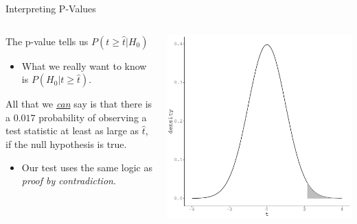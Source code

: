 \documentclass[10pt]{beamer}\usepackage[]{graphicx}\usepackage[]{color}
\makeatletter
\def\maxwidth{ %
  \ifdim\Gin@nat@width>\linewidth
    \linewidth
  \else
    \Gin@nat@width
  \fi
}
\newenvironment{knitrout}{}{} %
\makeatother
\begin{document}
\watermarkoff %

\begin{frame}{Interpreting P-Values}
  
  \begin{columns}
    \begin{column}{0.5\textwidth}
      
      The p-value tells us $P(t \geq \hat{t}|H_0)$
      \begin{itemize}
      \item What we really want to know is $P(H_0|t \geq \hat{t})$.
      \end{itemize}
      \vb 
      All that we \emph{\underline{can}} say is that there is a
      $0.017$ probability of observing a test statistic
      at least as large as $\hat{t}$, if the null hypothesis is true.
      \vc
      \begin{itemize}
      \item Our test uses the same logic as \emph{proof by contradiction}.
      \end{itemize}
      
    \end{column}
    \begin{column}{0.5\textwidth}

\begin{knitrout}\footnotesize
{}\color{fgcolor}

{\centering \includegraphics[width=\maxwidth]{figure/unnamed-chunk-16-1} 

}


\end{knitrout}

    \end{column}
  \end{columns}

\end{frame}
\end{document}
